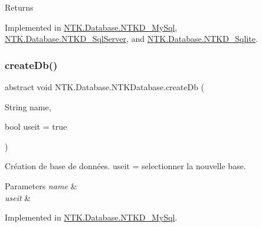 \begin{DoxyReturn}{Returns}

\end{DoxyReturn}


Implemented in \mbox{\hyperlink{class_n_t_k_1_1_database_1_1_n_t_k_d___my_sql_af3c165d5298437959df53c53ecf75c12}{N\+T\+K.\+Database.\+N\+T\+K\+D\+\_\+\+My\+Sql}}, \mbox{\hyperlink{class_n_t_k_1_1_database_1_1_n_t_k_d___sql_server_abfb6ed70d7c551c05d54efcc61598a07}{N\+T\+K.\+Database.\+N\+T\+K\+D\+\_\+\+Sql\+Server}}, and \mbox{\hyperlink{class_n_t_k_1_1_database_1_1_n_t_k_d___sqlite_ae728bf6ed129be1e86b382152394cd7c}{N\+T\+K.\+Database.\+N\+T\+K\+D\+\_\+\+Sqlite}}.

\mbox{\label{class_n_t_k_1_1_database_1_1_n_t_k_database_a53512203df942f293f26f78ed0613fad}} 
\subsubsection{\texorpdfstring{createDb()}{createDb()}\hspace{0.1cm}{\footnotesize\ttfamily [1/2]}}
{\footnotesize\ttfamily abstract void N\+T\+K.\+Database.\+N\+T\+K\+Database.\+create\+Db (\begin{DoxyParamCaption}\item[{String}]{name,  }\item[{bool}]{useit = {\ttfamily true} }\end{DoxyParamCaption})\hspace{0.3cm}{\ttfamily [pure virtual]}}



Création de base de données. useit = selectionner la nouvelle base. 


\begin{DoxyParams}{Parameters}
{\em name} & \\
\hline
{\em useit} & \\
\hline
\end{DoxyParams}


Implemented in \mbox{\hyperlink{class_n_t_k_1_1_database_1_1_n_t_k_d___my_sql_a6a33910d27ce2b66e2e0d2bf87469c33}{N\+T\+K.\+Database.\+N\+T\+K\+D\+\_\+\+My\+Sql}}.

\mbox{\label{class_n_t_k_1_1_database_1_1_n_t_k_database_a2e419744189f678f5cdad1f7a82116cd}} 
